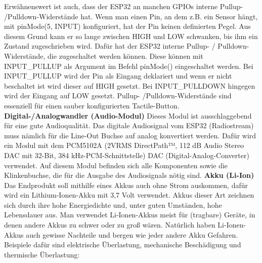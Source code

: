 \documentclass[11pt, twoside]{article}
\begin{document}
Erwähnenswert ist auch, dass der ESP32 an manchen GPIOs interne Pullup- /Pulldown-Widerstände hat. \glqq Wenn man einen Pin, an dem z.B. ein Sensor hängt, mit pinMode(5, INPUT) konfiguriert, hat der Pin keinen definierten Pegel.
Aus diesem Grund kann er so lange zwischen HIGH und LOW schwanken, bis ihm ein Zustand zugeschrieben wird. Dafür hat der ESP32 interne Pullup- / Pulldown-Widerstände, die zugeschaltet werden können. Diese können mit INPUT\_PULLUP als Argument im Befehl pinMode() eingeschaltet werden.
Bei INPUT\_PULLUP wird der Pin als Eingang deklariert und wenn er nicht beschaltet ist wird dieser auf HIGH gesetzt.
Bei INPUT\_PULLDOWN hingegen wird der Eingang auf LOW gesetzt.\grqq{} \parencite{noauthor_urlnl08_nodate} \newline
Pullup- /Pulldown-Widerstände sind essenziell für einen sauber konfigurierten Tactile-Button.
\newline
\parencite[vgl.][]{noauthor_urlnl06_nodate}\newline
\parencite[vgl.][]{noauthor_urlnl07_2023}\newline
\parencite[vgl.][]{noauthor_urlnl08_nodate}
\vspace{4mm}\newline
\textbf{Digital-/Analogwandler (Audio-Modul)}\newline
Dieses Modul ist ausschlaggebend für eine gute Audioqualität. Das digitale Audiosignal vom ESP32 (Radiostream) muss nämlich für die Line-Out Buchse auf analog konvertiert werden. Dafür wird ein Modul mit dem PCM5102A (\glqq 2VRMS DirectPath™, 112 dB Audio Stereo DAC mit 32-Bit, 384 kHz-PCM-Schnittstelle\grqq{}) DAC (Digital-Analog-Converter) verwendet. Auf diesem Modul befinden sich alle Komponenten sowie die Klinkenbuchse, die für die Ausgabe des Audiosignals nötig sind. \parencite[vgl.][]{noauthor_urlnl09_nodate}
\vspace{4mm}\newline
\textbf{Akku (Li-Ion)}\newline
Das Endprodukt soll mithilfe eines Akkus auch ohne Strom auskommen, dafür wird ein Lithium-Ionen-Akku mit 3,7 Volt verwendet. Akkus dieser Art zeichnen sich durch ihre hohe Energiedichte und, unter guten Umständen, hohe Lebensdauer aus. Man verwendet Li-Ionen-Akkus meist für (tragbare) Geräte, in denen andere Akkus zu schwer oder zu groß wären. \parencite[vgl.][]{noauthor_urlnl10_nodate} \vspace{4mm}\newline
Natürlich haben Li-Ionen-Akkus auch gewisse Nachteile und bergen wie jeder andere Akku Gefahren. Beispiele dafür sind elektrische Überlastung, mechanische Beschädigung und thermische Überlastung:
\end{document}
